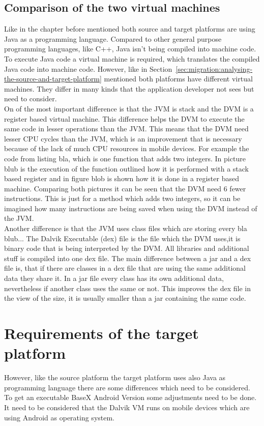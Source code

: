 \subsection{Comparison of the two virtual machines}
\label{sec:migration:comparison-of-the-two-virtual-machines}
Like in the chapter before mentioned both source and target platforms are using Java as a programming language.
Compared to other general purpose programming languages, like C++, Java isn't being compiled into machine code.
To execute Java code a virtual machine is required, which translates the compiled Java code into machine code.
However, like in Section~\ref{sec:migration:analysing-the-source-and-target-platform} mentioned both platforms have different virtual machines.
They differ in many kinds that the application developer not sees but need to consider.
\\
On of the most important difference is that the JVM is stack and the DVM is a register based virtual machine.
This difference helps the DVM to execute the same code in lesser operations than the JVM.
This means that the DVM need lesser CPU cycles than the JVM, which is an improvement that is necessary because of the lack of much CPU resources in mobile devices.
For example the code from listing bla, which is one function that adds two integers.
In picture blub is the execution of the function outlined how it is performed with a stack based register and in figure blob is shown how it is done in a register based machine.
Comparing both pictures it can be seen that the DVM need 6 fewer instructions.
This is just for a method which adds two integers, so it can be imagined how many instructions are being saved when using the DVM instead of the JVM.
\\
Another difference is that the JVM uses class files which are storing every bla blub...
The Dalvik Executable (dex) file is the file which the DVM uses,it is binary code that is being interpreted by the DVM. 
All libraries and additional stuff is compiled into one dex file.
The main difference between a jar and a dex file is, that if there are classes in a dex file that are using the same additional data they share it.
In a jar file every class has its own additional data, nevertheless if another class uses the same or not.
This improves the dex file in the view of the size, it is usually smaller than a jar containing the same code.


\section{Requirements of the target platform}
\label{sec:migration:requirmenets-of.the-target-platform}
However, like the source platform the target platform uses also Java as programming language there are some differences which need to be considered.
To get an executable BaseX Android Version some adjustments need to be done.
It need to be considered that the Dalvik VM runs on mobile devices which are using Android as operating system.

